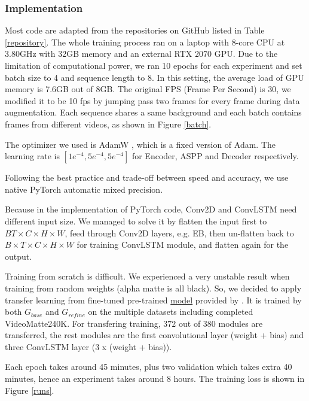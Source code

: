 \documentclass[final]{cvpr}
\begin{document}
\subsubsection{Implementation}

Most code are adapted from the repositories on GitHub listed in Table \ref{repository}.
The whole training process ran on a laptop with 8-core CPU at 3.80GHz with 32GB memory and an external RTX 2070 GPU.
Due to the limitation of computational power, we ran 10 epochs for each experiment and set batch size to 4 and sequence length to 8.
In this setting, the average load of GPU memory is 7.6GB out of 8GB.
The original FPS (Frame Per Second) is 30, we modified it to be 10 fps by jumping pass two frames for every frame during data augmentation.
Each sequence shares a same background and each batch contains frames from different videos, as shown in Figure \ref{batch}.

The optimizer we used is AdamW \cite{Loshchilov2017FixingWD}, which is a fixed version of Adam.
The learning rate is $[1e^{-4},5e^{-4},5e^{-4}]$ for Encoder, ASPP and Decoder respectively.

Following the best practice and trade-off between speed and accuracy, we use native PyTorch automatic mixed precision.

Because in the implementation of PyTorch code, Conv2D and ConvLSTM need different input size.
We managed to solve it by flatten the input first to $BT\times C\times H \times W$, feed through Conv2D layers, e.g. EB, then un-flatten back to $B\times T\times C\times H \times W$ for training ConvLSTM module, and flatten again for the output.

Training from scratch is difficult.
We experienced a very unstable result when training from random weights (alpha matte is all black).
So, we decided to apply transfer learning from fine-tuned pre-trained \href{https://drive.google.com/drive/folders/1cbetlrKREitIgjnIikG1HdM4x72FtgBh}{model} provided by \cite{linRealTimeHighResolutionBackground2020a}.
It is trained by both $G_{base}$ and $G_{refine}$ on the multiple datasets including completed VideoMatte240K.
For transfering training, $372$ out of $380$ modules are transferred, the rest modules are the first convolutional layer (weight + bias) and three ConvLSTM layer (3 x (weight + bias)).

Each epoch takes around 45 minutes, plus two validation which takes extra 40 minutes, hence an experiment takes around 8 hours.
The training loss is shown in Figure \ref{runs}.
\end{document}
